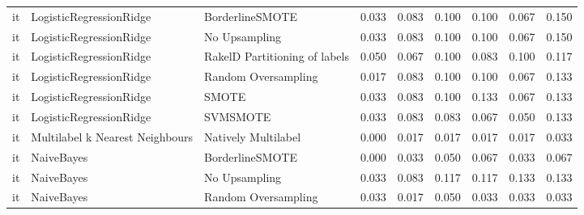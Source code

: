 \begin{tabular}{lllllllll}
      it &         LogisticRegressionRidge &               BorderlineSMOTE &     0.033 &                     0.083 &                 0.100 &                  0.100 &                                   0.067 &     0.150 \\
      it &         LogisticRegressionRidge &                 No Upsampling &     0.033 &                     0.083 &                 0.100 &                  0.100 &                                   0.067 &     0.150 \\
      it &         LogisticRegressionRidge & RakelD Partitioning of labels &     0.050 &                     0.067 &                 0.100 &                  0.083 &                                   0.100 &     0.117 \\
      it &         LogisticRegressionRidge &           Random Oversampling &     0.017 &                     0.083 &                 0.100 &                  0.100 &                                   0.067 &     0.133 \\
      it &         LogisticRegressionRidge &                         SMOTE &     0.033 &                     0.083 &                 0.100 &                  0.133 &                                   0.067 &     0.133 \\
      it &         LogisticRegressionRidge &                      SVMSMOTE &     0.033 &                     0.083 &                 0.083 &                  0.067 &                                   0.050 &     0.133 \\
      it & Multilabel k Nearest Neighbours &           Natively Multilabel &     0.000 &                     0.017 &                 0.017 &                  0.017 &                                   0.017 &     0.033 \\
      it &                      NaiveBayes &               BorderlineSMOTE &     0.000 &                     0.033 &                 0.050 &                  0.067 &                                   0.033 &     0.067 \\
      it &                      NaiveBayes &                 No Upsampling &     0.033 &                     0.083 &                 0.117 &                  0.117 &                                   0.133 &     0.133 \\
      it &                      NaiveBayes &           Random Oversampling &     0.033 &                     0.017 &                 0.050 &                  0.033 &                                   0.033 &     0.033 \\

\end{tabular}
